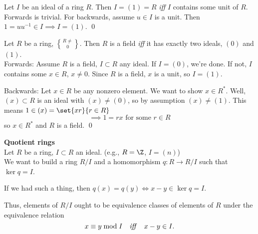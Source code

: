 \thm Let $I$ be an ideal of a ring $R$.  Then $I=(1)=R$ \emph{iff} $I$ contains some unit of $R$. \\
\pf Forwards is trivial.  For backwards, assume $u\in I$ is a unit.  Then $1=uu^{-1}\in I\implies I=(1)$. \qed

\thm Let $R$ be a ring, $R\neq\brace0$.  Then $R$ is a field \emph{iff} it has exactly two ideals, $(0)$ and $(1)$. \\
\pf Forwards: Assume $R$ is a field, $I\subset R$ any ideal.  If $I=(0)$, we're done.  If not, $I$ contains some $x\in R$, $x\neq0$.  Since $R$ is a field, $x$ is a unit, so $I=(1)$.

Backwards: Let $x\in R$ be any nonzero element.  We want to show $x\in R^*$.  Well, $(x)\subset R$ is an ideal with $(x)\neq(0)$, so by assumption $(x)\neq(1)$.  This means $1\in(x)=\set{xr}{r\in R}$
\[ \implies 1 = rx \text{ for some $r\in R$} \]
so $x\in R^*$ and $R$ is a field. \qed

\textbf{Quotient rings} \\
Let $R$ be a ring, $I\subset R$ an ideal. (e.g., $R=\Z$, $I=(n)$) \\
We want to build a ring $R/I$ and a homomorphism $q\colon R\to R/I$ such that $\ker q=I$.

If we had such a thing, then $q(x)=q(y)\iff x-y\in\ker q=I$.

Thus, elements of $R/I$ ought to be equivalence classes of elements of $R$ under the equivalence relation
\[ x\equiv y \bmod I \quad\text{\emph{iff}}\quad x-y\in I . \]
